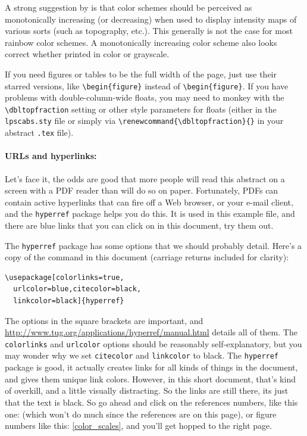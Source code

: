 \documentclass[twoside]{article}
\begin{document}
A strong suggestion by \citep{green2011colour} is that color schemes
should be perceived as monotonically increasing (or decreasing)
when used to display intensity maps of various sorts (such as
topography, etc.). This generally is not the case for most rainbow
color schemes. A monotonically increasing color scheme also looks
correct whether printed in color or grayscale.

If you need figures or tables to be the full width of the page,
just use their starred versions, like \verb=\begin{figure}= instead
of \verb=\begin{figure}=.  If you have problems with double-column-wide
floats, you may need to monkey with the \verb=\dbltopfraction=
setting or other style parameters for floats (either in the
\texttt{lpscabs.sty} file or simply via
\verb=\renewcommand{\dbltopfraction}{}= in your abstract \texttt{.tex}
file).

\paragraph{URLs and hyperlinks:}

Let's face it, the odds are good that more people will read this
abstract on a screen with a PDF reader than will do
so on paper.  Fortunately, PDFs can contain active hyperlinks that
can fire off a Web browser, or your e-mail client, and the
\verb=hyperref= package helps you do this.  It is used in this
example file, and there are blue links that you can click on in
this document, try them out.

The \verb=hyperref= package has some options that we should probably 
detail.  Here's a copy of the command in this document (carriage returns 
included for clarity):
\begin{verbatim}
\usepackage[colorlinks=true,
  urlcolor=blue,citecolor=black,
  linkcolor=black]{hyperref}
\end{verbatim}
\noindent
The options in the square brackets are important, and
\url{http://www.tug.org/applications/hyperref/manual.html} details
all of them.  The \verb=colorlinks= and \verb=urlcolor=
options should be reasonably self-explanatory, but you may wonder
why we set \verb=citecolor= and \verb=linkcolor= to black.  The
\verb=hyperref= package is good, it actually creates links for all
kinds of things in the document, and gives them unique link colors.
However, in this short document, that's kind of overkill, and a
little visually distracting.  So the links are still there, its
just that the text is black.  So go ahead and click on the references
numbers, like this one: \citep{latexguide} (which won't do much since
the references are on this page), or figure numbers like
this: \ref{color_scales}, and you'll get hopped to the right page.
\end{document}
